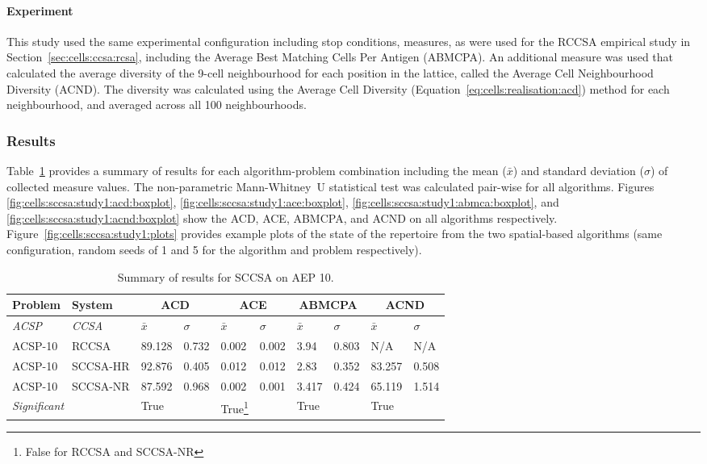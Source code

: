 %
%
\paragraph{Experiment}
This study used the same experimental configuration including stop conditions, measures, as were used for the RCCSA empirical study in Section~\ref{sec:cells:ccsa:rcsa}, including the Average Best Matching Cells Per Antigen (ABMCPA). 
An additional measure was used that calculated the average diversity of the 9-cell neighbourhood for each position in the lattice, called the Average Cell Neighbourhood Diversity (ACND). The diversity was calculated using the Average Cell Diversity (Equation~\ref{eq:cells:realisation:acd}) method for each neighbourhood, and averaged across all 100 neighbourhoods.

%
%
\subsubsection{Results}
Table~\ref{tab:cells:sccsa:study1} provides a summary of results for each algorithm-problem combination including the mean ($\bar{x}$) and standard deviation ($\sigma$) of collected measure values. The non-parametric Mann-Whitney~U statistical test was calculated pair-wise for all algorithms. 
Figures \ref{fig:cells:sccsa:study1:acd:boxplot}, \ref{fig:cells:sccsa:study1:ace:boxplot}, \ref{fig:cells:sccsa:study1:abmca:boxplot}, and \ref{fig:cells:sccsa:study1:acnd:boxplot} show the ACD, ACE, ABMCPA, and ACND on all algorithms respectively. 
Figure~\ref{fig:cells:sccsa:study1:plots} provides example plots of the state of the repertoire from the two spatial-based algorithms  (same configuration, random seeds of 1 and 5 for the algorithm and problem respectively). 

\begin{table}[htp]
	\centering\small
		\begin{minipage}{\textwidth}
		\begin{tabular}{llllllllll}
		\toprule
		\textbf{Problem} & \textbf{System} & \multicolumn{2}{c}{\textbf{ACD}} & \multicolumn{2}{c}{\textbf{ACE}} & \multicolumn{2}{c}{\textbf{ABMCPA}} & \multicolumn{2}{c}{\textbf{ACND}}\\
		\midrule
		\emph{ACSP} & \emph{CCSA} & $\bar{x}$ & $\sigma$ & $\bar{x}$ & $\sigma$ & $\bar{x}$ & $\sigma$ & $\bar{x}$ & $\sigma$\\
		\toprule
		ACSP-10 & RCCSA & 89.128 & 0.732 & 0.002 & 0.002 & 3.94 & 0.803 & N/A & N/A \\
		ACSP-10 & SCCSA-HR & 92.876 & 0.405 & 0.012 & 0.012 & 2.83 & 0.352 & 83.257 & 0.508 \\
		ACSP-10 & SCCSA-NR & 87.592 & 0.968 & 0.002 & 0.001 & 3.417 & 0.424 & 65.119 & 1.514 \\
		\multicolumn{2}{l}{\emph{Significant}} & True &  & True\footnote{False for RCCSA and SCCSA-NR} &  & True &  & True & \\
		\bottomrule
		\end{tabular}
		\end{minipage}
	\caption{Summary of results for SCCSA on AEP 10.}
	\label{tab:cells:sccsa:study1}
\end{table}


